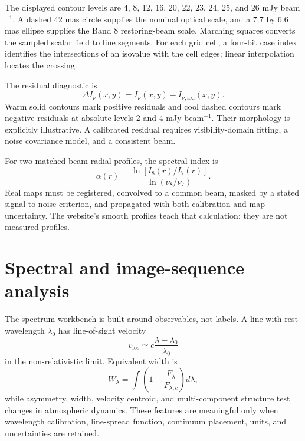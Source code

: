 \documentclass[11pt,a4paper]{article}
\begin{document}
The displayed contour levels are 4, 8, 12, 16, 20, 22, 23, 24, 25, and 26 mJy beam$^{-1}$. A dashed 42 mas circle supplies the nominal optical scale, and a 7.7 by 6.6 mas ellipse supplies the Band 8 restoring-beam scale. Marching squares converts the sampled scalar field to line segments. For each grid cell, a four-bit case index identifies the intersections of an isovalue with the cell edges; linear interpolation locates the crossing.

The residual diagnostic is
\begin{equation}
\Delta I_\nu(x,y)=I_\nu(x,y)-I_{\nu,\mathrm{axi}}(x,y).
\end{equation}
Warm solid contours mark positive residuals and cool dashed contours mark negative residuals at absolute levels 2 and 4 mJy beam$^{-1}$. Their morphology is explicitly illustrative. A calibrated residual requires visibility-domain fitting, a noise covariance model, and a consistent beam.

For two matched-beam radial profiles, the spectral index is
\begin{equation}
\alpha(r)=\frac{\ln[I_8(r)/I_7(r)]}{\ln(\nu_8/\nu_7)}.
\end{equation}
Real maps must be registered, convolved to a common beam, masked by a stated signal-to-noise criterion, and propagated with both calibration and map uncertainty. The website's smooth profiles teach that calculation; they are not measured profiles.

\section{Spectral and image-sequence analysis}

The spectrum workbench is built around observables, not labels. A line with rest wavelength $\lambda_0$ has line-of-sight velocity
\begin{equation}
v_{\mathrm{los}}\simeq c\frac{\lambda-\lambda_0}{\lambda_0}
\end{equation}
in the non-relativistic limit. Equivalent width is
\begin{equation}
W_\lambda=\int\left(1-\frac{F_\lambda}{F_{\lambda,c}}\right)d\lambda,
\end{equation}
while asymmetry, width, velocity centroid, and multi-component structure test changes in atmospheric dynamics. These features are meaningful only when wavelength calibration, line-spread function, continuum placement, units, and uncertainties are retained.
\end{document}
